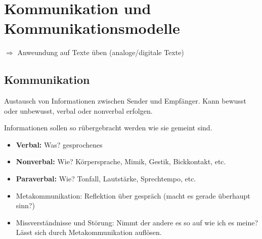 
\section{Kommunikation und Kommunikationsmodelle}
$\Rightarrow$ Anweundung auf Texte üben (analoge/digitale Texte)


\subsection{Kommunikation}

 Austausch von Informationen zwischen Sender und Empfänger. Kann bewusst oder unbewusst, verbal oder nonverbal erfolgen.

 Informationen sollen so rübergebracht werden wie sie gemeint sind.

\begin{itemize}
    \item \textbf{Verbal:} Was? gesprochenes
    \item \textbf{Nonverbal:} Wie? Körpersprache, Mimik, Gestik, Bickkontakt, etc.
    \item \textbf{Paraverbal:} Wie? Tonfall, Lautstärke, Sprechtempo, etc.
\end{itemize}



\begin{itemize}
    \item Metakommunikation: Reflektion über gespräch (macht es gerade überhaupt sinn?)
    \item Missverständnisse und Störung: Nimmt der andere es so auf wie ich es meine? Lässt sich durch Metakommunikation auflösen.
\end{itemize}




